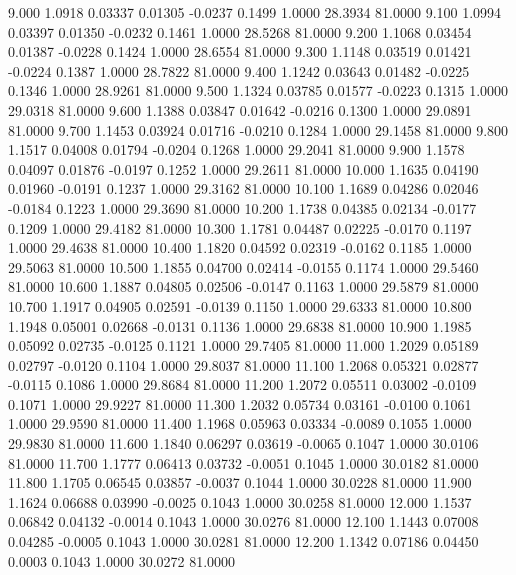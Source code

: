    9.000   1.0918   0.03337   0.01305  -0.0237   0.1499   1.0000  28.3934  81.0000
   9.100   1.0994   0.03397   0.01350  -0.0232   0.1461   1.0000  28.5268  81.0000
   9.200   1.1068   0.03454   0.01387  -0.0228   0.1424   1.0000  28.6554  81.0000
   9.300   1.1148   0.03519   0.01421  -0.0224   0.1387   1.0000  28.7822  81.0000
   9.400   1.1242   0.03643   0.01482  -0.0225   0.1346   1.0000  28.9261  81.0000
   9.500   1.1324   0.03785   0.01577  -0.0223   0.1315   1.0000  29.0318  81.0000
   9.600   1.1388   0.03847   0.01642  -0.0216   0.1300   1.0000  29.0891  81.0000
   9.700   1.1453   0.03924   0.01716  -0.0210   0.1284   1.0000  29.1458  81.0000
   9.800   1.1517   0.04008   0.01794  -0.0204   0.1268   1.0000  29.2041  81.0000
   9.900   1.1578   0.04097   0.01876  -0.0197   0.1252   1.0000  29.2611  81.0000
  10.000   1.1635   0.04190   0.01960  -0.0191   0.1237   1.0000  29.3162  81.0000
  10.100   1.1689   0.04286   0.02046  -0.0184   0.1223   1.0000  29.3690  81.0000
  10.200   1.1738   0.04385   0.02134  -0.0177   0.1209   1.0000  29.4182  81.0000
  10.300   1.1781   0.04487   0.02225  -0.0170   0.1197   1.0000  29.4638  81.0000
  10.400   1.1820   0.04592   0.02319  -0.0162   0.1185   1.0000  29.5063  81.0000
  10.500   1.1855   0.04700   0.02414  -0.0155   0.1174   1.0000  29.5460  81.0000
  10.600   1.1887   0.04805   0.02506  -0.0147   0.1163   1.0000  29.5879  81.0000
  10.700   1.1917   0.04905   0.02591  -0.0139   0.1150   1.0000  29.6333  81.0000
  10.800   1.1948   0.05001   0.02668  -0.0131   0.1136   1.0000  29.6838  81.0000
  10.900   1.1985   0.05092   0.02735  -0.0125   0.1121   1.0000  29.7405  81.0000
  11.000   1.2029   0.05189   0.02797  -0.0120   0.1104   1.0000  29.8037  81.0000
  11.100   1.2068   0.05321   0.02877  -0.0115   0.1086   1.0000  29.8684  81.0000
  11.200   1.2072   0.05511   0.03002  -0.0109   0.1071   1.0000  29.9227  81.0000
  11.300   1.2032   0.05734   0.03161  -0.0100   0.1061   1.0000  29.9590  81.0000
  11.400   1.1968   0.05963   0.03334  -0.0089   0.1055   1.0000  29.9830  81.0000
  11.600   1.1840   0.06297   0.03619  -0.0065   0.1047   1.0000  30.0106  81.0000
  11.700   1.1777   0.06413   0.03732  -0.0051   0.1045   1.0000  30.0182  81.0000
  11.800   1.1705   0.06545   0.03857  -0.0037   0.1044   1.0000  30.0228  81.0000
  11.900   1.1624   0.06688   0.03990  -0.0025   0.1043   1.0000  30.0258  81.0000
  12.000   1.1537   0.06842   0.04132  -0.0014   0.1043   1.0000  30.0276  81.0000
  12.100   1.1443   0.07008   0.04285  -0.0005   0.1043   1.0000  30.0281  81.0000
  12.200   1.1342   0.07186   0.04450   0.0003   0.1043   1.0000  30.0272  81.0000
